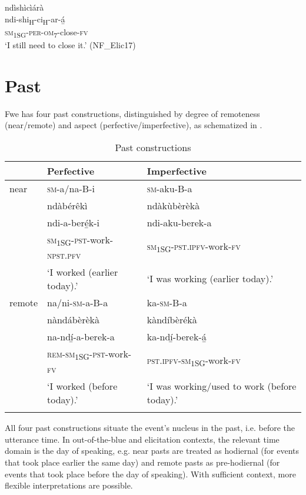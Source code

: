 \ea
\label{bkm:Ref494964767}
\glll ndìshìcìárà\\
ndi-shi\textsubscript{H}-ci\textsubscript{H}-ar-á̲\\
\textsc{sm}\textsubscript{1SG}-\textsc{per}-\textsc{om}\textsubscript{7}-close-\textsc{fv}\\
\glt ‘I still need to close it.’ (NF\_Elic17)
\z
\section{Past}
\hypertarget{Toc75352680}{}
Fwe has four past constructions, distinguished by degree of remoteness (near/remote) and aspect (perfective/imperfective), as schematized in .

\begin{table}
\label{bkm:Ref486847003}\caption{\label{tab:8:5}Past constructions}
\begin{tabularx}{\textwidth}{lQQ}
\lsptoprule
& Perfective & Imperfective\\
\midrule
near & \textsc{sm}-a/na-B-i & \textsc{sm}-aku-B-a \\
\midrule
& ndàbérêkì & ndàkùbèrèkà \\
& ndi-a-beré̲k-i & ndi-aku-berek-a\\
& \textsc{sm}\textsubscript{1SG}-\textsc{pst}-work-\textsc{npst}.\textsc{pfv} & \textsc{sm}\textsubscript{1SG}-\textsc{pst}.\textsc{ipfv}-work-\textsc{fv}\\
& ‘I worked (earlier today).’ & ‘I was working (earlier today).’\\
\midrule
remote & na/ni-\textsc{sm}-a-B-a & ka-\textsc{sm}-B-a \\
\midrule
& nàndábèrèkà & kàndíbèrékà \\
& na-ndí̲-a-berek-a & ka-ndí̲-berek-á̲\\
& \textsc{rem}-\textsc{sm}\textsubscript{1SG}-\textsc{pst}-work-\textsc{fv} & \textsc{pst}.\textsc{ipfv}-\textsc{sm}\textsubscript{1SG}-work-\textsc{fv}\\
& ‘I worked (before today).’ & ‘I was working/used to work (before today).’\\
\lspbottomrule
\end{tabularx}
\end{table}

All four past constructions situate the event’s nucleus in the past, i.e. before the utterance time. In out-of-the-blue and elicitation contexts, the relevant time domain is the day of speaking, e.g. near pasts are treated as hodiernal (for events that took place earlier the same day) and remote pasts as pre-hodiernal (for events that took place before the day of speaking). With sufficient context, more flexible interpretations are possible.

